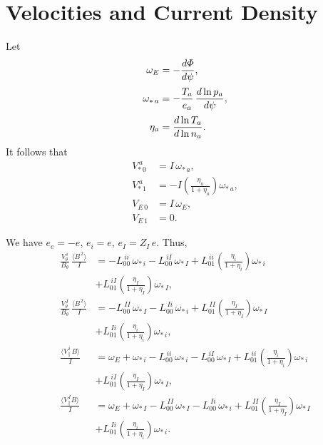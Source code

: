 \documentclass[12pt]{article}
\begin{document}
\section{Velocities and Current Density}
Let
\begin{align}
\omega_E &=-\frac{d{\mit\Phi}}{d\psi},\\[0.5ex]
\omega_{\ast\,a} &= -\frac{T_a}{e_a}\,\frac{d\ln p_a}{d\psi},\\[0.5ex]
\eta_a &= \frac{d\ln T_a}{d\ln n_a}.
\end{align}
It follows that
\begin{align}
V_{\ast\,0}^{\,a}&= I\,\omega_{\ast\,a},\\[0.5ex]
V_{\ast\,1}^{\,a} &=-I\left(\frac{\eta_a}{1+\eta_a}\right)\omega_{\ast\,a},\\[0.5ex]
V_{E\,0}&= I\,\omega_{E},\\[0.5ex]
V_{E\,1} &=0.
\end{align}

We have $e_e=-e$, $e_i=e$, $e_I= Z_I\,e$. 
Thus,
\begin{align}
\frac{V_\theta^{\,i}}{B_\theta}\,\frac{\langle B^{\,2}\rangle}{I} &= -L^{\,ii}_{00}\,\omega_{\ast\,i}-
L^{\,iI}_{00}\,\omega_{\ast\,I}+L^{\,ii}_{01}\left(\frac{\eta_i}{1+\eta_i}\right)\omega_{\ast\,i}\nonumber\\[0.5ex]\phantom{=}
&+L^{\,iI}_{01}\left(\frac{\eta_I}{1+\eta_I}\right)\omega_{\ast\,I},\\[0.5ex]
\frac{V_\theta^{\,I}}{B_\theta}\,\frac{\langle B^{\,2}\rangle}{I} &= -L^{\,II}_{00}\,\omega_{\ast\,I}-
L^{\,Ii}_{00}\,\omega_{\ast\,i}+L^{\,II}_{01}\left(\frac{\eta_I}{1+\eta_I}\right)\omega_{\ast\,I}\nonumber\\[0.5ex]\phantom{=}
&+L^{\,Ii}_{01}\left(\frac{\eta_i}{1+\eta_i}\right)\omega_{\ast\,i},\\[0.5ex]
\frac{\langle V_\parallel^{\,i}\,B\rangle}{I} &=\omega_E +\omega_{\ast\,i}-L^{\,ii}_{00}\,\omega_{\ast\,i}-
L^{\,iI}_{00}\,\omega_{\ast\,I}+L^{\,ii}_{01}\left(\frac{\eta_i}{1+\eta_i}\right)\omega_{\ast\,i}\nonumber\\[0.5ex]\phantom{=}
&+L^{\,iI}_{01}\left(\frac{\eta_I}{1+\eta_I}\right)\omega_{\ast\,I},\\[0.5ex]
\frac{\langle V_\parallel^{\,I} B\rangle}{I} &= \omega_E +\omega_{\ast\,I}-L^{\,II}_{00}\,\omega_{\ast\,I}-
L^{\,Ii}_{00}\,\omega_{\ast\,i}+L^{\,II}_{01}\left(\frac{\eta_I}{1+\eta_I}\right)\omega_{\ast\,I}\nonumber\\[0.5ex]\phantom{=}
&+L^{\,Ii}_{01}\left(\frac{\eta_i}{1+\eta_i}\right)\omega_{\ast\,i}.
\end{align}
\end{document}

